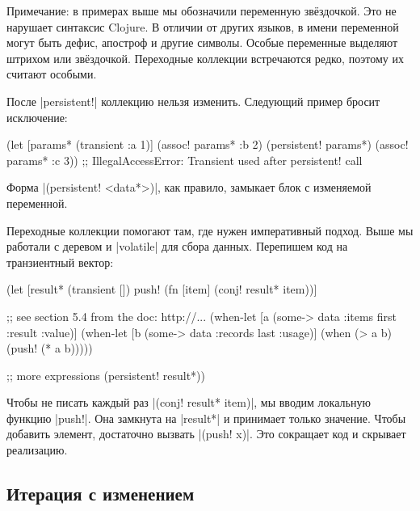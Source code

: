 Примечание: в примерах выше мы обозначили переменную зв\"{е}здочкой. Это не нарушает
синтаксис Clojure. В отличии от других языков, в имени переменной могут быть
дефис, апостроф и другие символы. Особые переменные выделяют штрихом или
зв\"{е}здочкой. Переходные коллекции встречаются редко, поэтому их считают особыми.

После \spverb|persistent!| коллекцию нельзя изменить. Следующий пример бросит
исключение:

\begin{english}
  \begin{clojure}
(let [params* (transient {:a 1})]
  (assoc! params* :b 2)
  (persistent! params*)
  (assoc! params* :c 3))
;; IllegalAccessError: Transient used after persistent! call
  \end{clojure}
\end{english}

Форма \spverb|(persistent! <data*>)|, как правило, замыкает блок с изменяемой
переменной.

Переходные коллекции помогают там, где нужен императивный подход. Выше мы
работали с деревом и \spverb|volatile| для сбора данных. Перепишем код на
транзиентный вектор:

\begin{english}
  \begin{clojure}
(let [result* (transient [])
      push! (fn [item]
              (conj! result* item))]

  ;; see section 5.4 from the doc: http://...
  (when-let [a (some-> data :items first :result :value)]
    (when-let [b (some-> data :records last :usage)]
      (when (> a b)
        (push! (* a b)))))

  ;; more expressions
  (persistent! result*))
  \end{clojure}
\end{english}


Чтобы не писать каждый раз \spverb|(conj! result* item)|, мы
вводим локальную функцию \spverb|push!|. Она замкнута на \spverb|result*| и
принимает только значение. Чтобы добавить элемент, достаточно вызвать
\spverb|(push! x)|. Это сокращает код и скрывает реализацию.

\subsection{Итерация с изменением}


